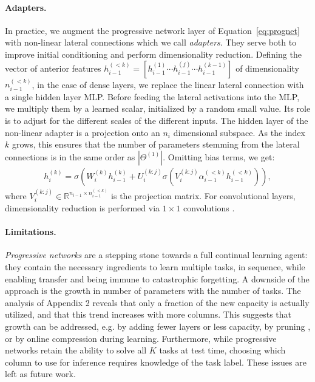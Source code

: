 \documentclass{article}
\begin{document}
\paragraph{Adapters.}
In practice, we augment the progressive network layer of Equation~\ref{eq:prognet} with
non-linear lateral connections which we call \textit{adapters}. They serve
both to improve initial conditioning and perform dimensionality reduction.
Defining the vector of anterior features
$h_{i-1}^{(<k)} = [h_{i-1}^{(1)} \cdots h_{i-1}^{(j)} \cdots h_{i-1}^{(k-1)}]$
of dimensionality $n_{i-1}^{(<k)}$, in the case of dense layers,
we replace the linear lateral connection with a single hidden layer MLP.
Before feeding the lateral activations into the MLP, we multiply them by a learned scalar,
initialized by a random small value.
Its role is to adjust for the different scales of the different inputs.
The hidden layer of the non-linear adapter is a projection onto an $n_{i}$ dimensional
subspace.  As the
index $k$ grows, this ensures that the number of parameters stemming from the
lateral connections is in the same order as $\left|\Theta^{(1)} \right|$. Omitting bias
terms, we get:
\begin{align}
  \label{eq:prognet}
  h_i^{(k)} = \sigma \left( W_i^{(k)} h_{i-1}^{(k)} + U_{i}^{(k:j)} \sigma(V_{i}^{(k:j)} \alpha_{i-1}^{(<k)} h_{i-1}^{(<k)}) \right),
\end{align}
where $V_{i}^{(k:j)} \in \mathbb{R}^{n_{i-1} \times n_{i-1}^{(<k)}}$ is the projection
matrix. For convolutional layers, dimensionality reduction is
performed via $1\times 1$ convolutions \cite{LinCY13}.

\paragraph{Limitations.}
\textit{Progressive networks} are a stepping stone towards a full continual
learning agent: they contain the necessary ingredients to learn multiple tasks,
in sequence, while enabling transfer and being immune to catastrophic
forgetting. A downside of the approach is the growth in number of
parameters with the number of tasks.
The analysis of Appendix 2 reveals
that only a fraction of the new capacity is actually utilized, and that this trend increases with more columns. This
suggests that growth can be addressed, e.g. by adding fewer layers or less capacity, by pruning \cite{Cun90optimalbrain}, or by online compression
\cite{Rusu15} during learning.  Furthermore, while progressive networks retain the
ability to solve all $K$ tasks at test time, choosing which column to use for
inference requires knowledge of the task label. These issues are left as future
work.
\end{document}
